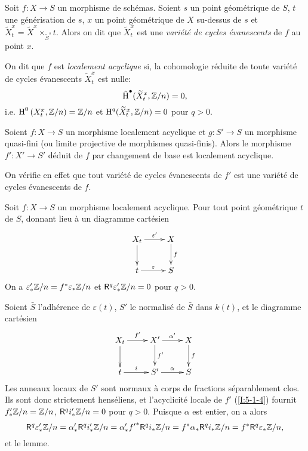 \documentclass[oneside]{book}
\begin{document}
\begin{definition}\label{I:5-1-3}
Soit $f:X\to S$ un morphisme de schémas. Soient $s$ un point géométrique de 
$S$, $t$ une générisation de $s$, $x$ un point géométrique de $X$ 
su-dessus de $s$ et 
$\widetilde X_t^x = \widetilde X^x\times_{\widetilde S^s} t$. Alors on dit que 
$\widetilde X_t^x$ est une \emph{variété de cycles évanescents} de $f$ au 
point $x$. 

On dit que $f$ est \emph{localement acyclique} si, la cohomologie réduite de 
toute variété de cycles évanescents $\widetilde X_t^x$ est nulle:
\begin{equation}\label{I:eq:5}
  \hat{\operatorname{H}}^\bullet(\widetilde X_t^x,\mathbb{Z}/n) = 0\text{,}
\end{equation}
i.e. $\operatorname{H}^0\left(X_t^x,\mathbb{Z}/n\right) = \mathbb{Z}/n$ et 
$\operatorname{H}^q(\widetilde X_t^x,\mathbb{Z}/n) = 0$ pour $q>0$. 
\end{definition}





\begin{lemma}\label{I:5-1-4}
Soient $f:X\to S$ un morphisme localement acyclique et $g:S'\to S$ un morphisme 
quasi-fini (ou limite projective de morphismes quasi-finis). Alors le 
morphisme $f':X'\to S'$ déduit de $f$ par changement de base est localement 
acyclique.
\end{lemma}

On vérifie en effet que tout variété de cycles évanescents de $f'$ est 
une variété de cycles évanescents de $f$.  	





\begin{lemma}\label{I:5-1-5}
Soit $f:X\to S$ un morphisme localement acyclique. Pour tout point géométrique 
$t$ de $S$, donnant lieu à un diagramme cartésien 
\[\xymatrix{
  X_t \ar[r]^-{\varepsilon'} \ar[d] 
    & X \ar[d]^-f \\
  t \ar[r]^-\varepsilon 
    & S
}\]
On a $\varepsilon_*' \mathbb{Z}/n = f^*\varepsilon_* \mathbb{Z}/n$ et $\mathsf{R}^q \varepsilon_*'\mathbb{Z}/n=0$ 
pour $q>0$. 
\end{lemma}

Soient $\bar S$ l'adhérence de $\varepsilon(t)$, $S'$ le normalisé de $\bar S$ 
dans $k(t)$, et le diagramme cartésien 
\[\xymatrix{
  X_t \ar[r]^-{f'} \ar[d] 
    & X' \ar[r]^-{\alpha'} \ar[d]^-{f'} 
    & X \ar[d]^-f \\
  t \ar[r]^-i 
    & S' \ar[r]^-\alpha 
    & S
}\]
Les anneaux locaux de $S'$ sont normaux à corps de fractions séparablement 
clos. Ils sont donc strictement henséliens, et l'acyclicité locale de $f'$ 
(\ref{I:5-1-4}) fournit $f_*'\mathbb{Z}/n = \mathbb{Z}/n$, $\mathsf{R}^qi_*'\mathbb{Z}/n = 0$ pour $q>0$. 
Puisque $\alpha$ est entier, on a alors 
\[
  \mathsf{R}^q\varepsilon_*'\mathbb{Z}/n 
    = \alpha_*' \mathsf{R}^q i_*' \mathbb{Z}/n 
    = \alpha_*' {f'}^* \mathsf{R}^q i_* \mathbb{Z}/n 
    = f^* \alpha_* \mathsf{R}^q i_* \mathbb{Z}/n 
    = f^* \mathsf{R}^q \varepsilon_* \mathbb{Z}/n \text{,}
\]
et le lemme. 
\end{document}
